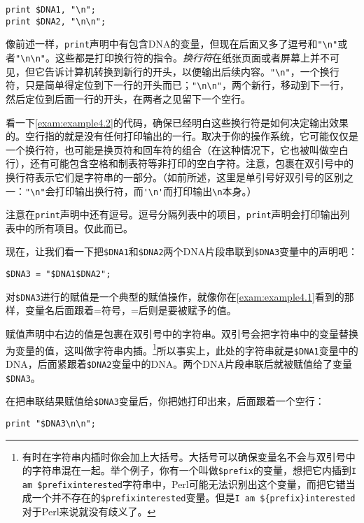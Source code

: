 \begin{lstlisting}
print $DNA1, "\n";
print $DNA2, "\n\n";
\end{lstlisting}

像前述一样，\verb|print|声明中有包含DNA的变量，但现在后面又多了逗号和\verb|"\n"|或者\verb|"\n\n"|。这些都是打印换行符的指令。\textit{换行符}在纸张页面或者屏幕上并不可见，但它告诉计算机转换到新行的开头，以便输出后续内容。\verb|"\n"|，一个换行符，只是简单得定位到下一行的开头而已；\verb|"\n\n"|，两个新行，移动到下一行，然后定位到后面一行的开头，在两者之见留下一个空行。

看一下\autoref{exam:example4.2}的代码，确保已经明白这些换行符是如何决定输出效果的。空行指的就是没有任何打印输出的一行。取决于你的操作系统，它可能仅仅是一个换行符，也可能是换页符和回车符的组合（在这种情况下，它也被叫做空白行），还有可能包含空格和制表符等非打印的空白字符。注意，包裹在双引号中的换行符表示它们是字符串的一部分。（如前所述，这里是单引号好双引号的区别之一：\verb|"\n"|会打印输出换行符，而\verb|'\n'|而打印输出\verb|\n|本身。）

注意在\verb|print|声明中还有逗号。逗号分隔列表中的项目，\verb|print|声明会打印输出列表中的所有项目。仅此而已。

现在，让我们看一下把\verb|$DNA1|和\verb|$DNA2|两个DNA片段串联到\verb|$DNA3|变量中的声明吧：

\begin{lstlisting}
$DNA3 = "$DNA1$DNA2"; 
\end{lstlisting}

对\verb|$DNA3|进行的赋值是一个典型的赋值操作，就像你在\autoref{exam:example4.1}看到的那样，变量名后面跟着=符号，=后则是要被赋予的值。

赋值声明中右边的值是包裹在双引号中的字符串。双引号会把字符串中的变量替换为变量的值，这叫做字符串内插。\footnote{有时在字符串内插时你会加上大括号。大括号可以确保变量名不会与双引号中的字符串混在一起。举个例子，你有一个叫做\verb|$prefix|的变量，想把它内插到\verb|I am $prefixinterested|字符串中，Perl可能无法识别出这个变量，而把它错当成一个并不存在的\verb|$prefixinterested|变量。但是\verb|I am ${prefix}interested|对于Perl来说就没有歧义了。}所以事实上，此处的字符串就是\verb|$DNA1|变量中的DNA，后面紧跟着\verb|$DNA2|变量中的DNA。两个DNA片段串联后就被赋值给了变量\verb|$DNA3|。

在把串联结果赋值给\verb|$DNA3|变量后，你把她打印出来，后面跟着一个空行：

\begin{lstlisting}
print "$DNA3\n\n";
\end{lstlisting}

